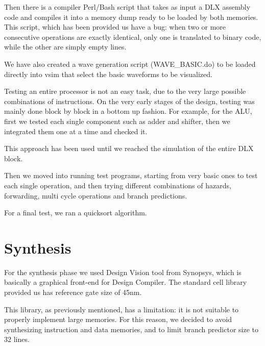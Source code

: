 \documentclass[12pt]{article}
\begin{document}
Then there is a compiler Perl/Bash script that takes as input a DLX assembly code and compiles it into a memory dump ready to be loaded by both memories.
This script, which has been provided us have a bug: when two or more consecutive operations are exactly identical, only one is translated to binary code, while the other are simply empty lines.

We have also created a wave generation script (WAVE\_BASIC.do) to be loaded directly into vsim that select the basic waveforms to be visualized.

Testing an entire processor is not an easy task, due to the very large possible combinations of instructions.
On the very early stages of the design, testing was mainly done block by block in a bottom up fashion.
For example, for the ALU, first we tested each single component such as adder and shifter, then we integrated them one at a time and checked it.

This approach has been used until we reached the simulation of the entire DLX block.


Then we moved into running test programs, starting from very basic ones to test each single operation, and then trying different combinations of hazards, forwarding, multi cycle operations and branch predictions.

For a final test, we ran a quicksort algorithm.


\section{Synthesis}\label{Synthesis}
For the synthesis phase we used Design Vision tool from Synopsys, which is basically a graphical front-end for Design Compiler.
The standard cell library provided us has reference gate size of 45nm.

This library, as previously mentioned, has a limitation: it is not suitable to properly implement large memories.
For this reason, we decided to avoid synthesizing instruction and data memories, and to limit branch predictor size to 32 lines.
\end{document}
